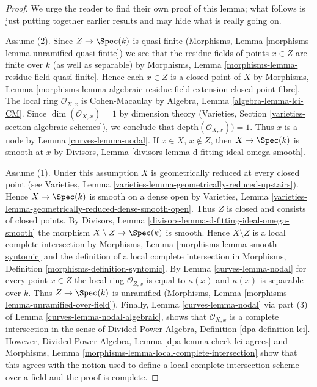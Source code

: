 \begin{proof}

We urge the reader to find their own proof of
this lemma; what follows is just putting together earlier results
and may hide what is really going on.

\medskip\noindent
Assume (2). Since $Z \to \Spec(k)$ is quasi-finite
(Morphisms, Lemma \ref{morphisms-lemma-unramified-quasi-finite})
we see that the residue fields of points $x \in Z$ are finite
over $k$ (as well as separable) by
Morphisms, Lemma \ref{morphisms-lemma-residue-field-quasi-finite}.
Hence each $x \in Z$ is a closed point of $X$ by
Morphisms, Lemma
\ref{morphisms-lemma-algebraic-residue-field-extension-closed-point-fibre}.
The local ring $\mathcal{O}_{X, x}$ is Cohen-Macaulay by
Algebra, Lemma \ref{algebra-lemma-lci-CM}.
Since $\dim(\mathcal{O}_{X, x}) = 1$ by dimension theory
(Varieties, Section \ref{varieties-section-algebraic-schemes}), we conclude
that $\text{depth}(\mathcal{O}_{X, x})) = 1$. Thus $x$ is a node
by Lemma \ref{curves-lemma-nodal}. If $x \in X$, $x \not \in Z$, then
$X \to \Spec(k)$ is smooth at $x$ by
Divisors, Lemma \ref{divisors-lemma-d-fitting-ideal-omega-smooth}.

\medskip\noindent
Assume (1). Under this assumption $X$ is geometrically reduced
at every closed point (see
Varieties, Lemma \ref{varieties-lemma-geometrically-reduced-upstairs}).
Hence $X \to \Spec(k)$ is smooth on a dense open by
Varieties, Lemma \ref{varieties-lemma-geometrically-reduced-dense-smooth-open}.
Thus $Z$ is closed and consists of closed points.
By Divisors, Lemma \ref{divisors-lemma-d-fitting-ideal-omega-smooth}
the morphism $X \setminus Z \to \Spec(k)$ is smooth.
Hence $X \setminus Z$ is a local complete intersection by
Morphisms, Lemma \ref{morphisms-lemma-smooth-syntomic}
and the definition of a local complete intersection in
Morphisms, Definition \ref{morphisms-definition-syntomic}.
By Lemma \ref{curves-lemma-nodal} for every point $x \in Z$
the local ring $\mathcal{O}_{Z, x}$ is equal to $\kappa(x)$
and $\kappa(x)$ is separable over $k$. Thus $Z \to \Spec(k)$
is unramified (Morphisms, Lemma \ref{morphisms-lemma-unramified-over-field}).
Finally, Lemma \ref{curves-lemma-nodal} via part (3) of
Lemma \ref{curves-lemma-nodal-algebraic}, shows that $\mathcal{O}_{X, x}$
is a complete intersection in the sense of
Divided Power Algebra, Definition \ref{dpa-definition-lci}.
However, Divided Power Algebra, Lemma \ref{dpa-lemma-check-lci-agrees}
and Morphisms, Lemma \ref{morphisms-lemma-local-complete-intersection}
show that this agrees with the notion used to define a local
complete intersection scheme over a field and the proof is complete.
\end{proof}

